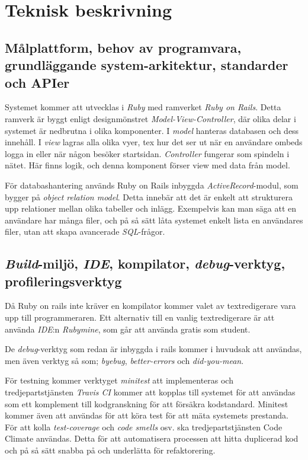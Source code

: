 \documentclass[a4paper,12pt,oneside,final]{extbook}
\begin{document}
\chapter{Teknisk beskrivning}
\section{Målplattform, behov av programvara, grundläggande system-arkitektur, standarder och APIer}
Systemet kommer att utvecklas i \emph{Ruby} med ramverket \emph{Ruby on Rails}.
Detta ramverk är byggt enligt designmönstret \emph{Model-View-Controller}, där
olika delar i systemet är nedbrutna i olika komponenter. I \emph{model} hanteras
databasen och dess innehåll. I \emph{view} lagras alla olika vyer, tex hur det
ser ut när en användare ombeds logga in eller när någon besöker startsidan.
\emph{Controller} fungerar som spindeln i nätet. Här finns logik, och denna
komponent förser view med data från model.

För databashantering används Ruby on Rails inbyggda \emph{ActiveRecord}-modul,
som bygger på \emph{object relation model}. Detta innebär att det är enkelt
att strukturera upp relationer mellan olika tabeller och inlägg. Exempelvis
kan man säga att en användare har många filer, och på så sätt låta systemet
enkelt lista en användares filer, utan att skapa avancerade \emph{SQL}-frågor.

\section{\emph{Build}-miljö, \emph{IDE}, kompilator, \emph{debug}-verktyg, profileringsverktyg}
Då Ruby on rails inte kräver en kompilator kommer valet av textredigerare
vara upp till programmeraren. Ett alternativ till en vanlig textredigerare
är att använda \emph{IDE}:n \emph{Rubymine}, som går att använda gratis som
student.

De \emph{debug}-verktyg som redan är inbyggda i rails kommer i huvudsak att
användas, men även verktyg så som; \emph{byebug}, \emph{better-errors} och
\emph{did-you-mean}.

För testning kommer verktyget \emph{minitest} att implementeras och
tredjepartstjänsten \emph{Travis CI} kommer att kopplas till systemet för
att användas som ett komplement till kodgranskning för att försäkra kodstandard.
Minitest kommer även att användas för att köra test för att mäta systemets prestanda.
För att kolla \emph{test-coverage} och \emph{code smells} osv. ska tredjepartstjänsten
Code Climate användas. Detta för att automatisera processen att hitta duplicerad
kod och på så sätt snabba på och underlätta för refaktorering.
\end{document}
